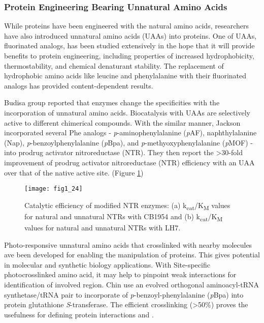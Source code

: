 \begin{refsection}
\subsubsection{Protein Engineering Bearing Unnatural Amino Acids}
\label{sec:uaa-intro}

While proteins have been engineered with the natural amino acids, researchers
have also introduced unnatural amino acids (UAAs) into
proteins\cite{Odar2015,Hassan2008,Kiick2000,Hammill2007,Meinnel1990,Johnson2010}.
One of UAAs, fluorinated analogs, has been studied extensively in the hope that
it will provide benefits to protein engineering, including properties of
increased hydrophobicity\cite{Biffinger2004},
thermostability\cite{Voloshchuk2010,Baker2011b}, and chemical denaturant
stability\cite{Voloshchuk2007b}. The replacement of hydrophobic amino acids
like leucine and phenylalanine with their fluorinated analogs has provided
content-dependent results\cite{Tang2001}.

Budisa group reported that enzymes change the specificities with the
incorporation of unnatural amino acids\cite{Budisa2006}. Biocatalysis with UAAs
are selectively active to different chimerical compounds. With the similar
manner, Jackson  incorporated several Phe analogs -
\emph{p}-aminophenylalanine (\emph{p}AF), naphthylalanine (Nap),
\emph{p}-benzoylphenylalanine (\emph{p}Bpa), and \emph{p}-methyoxyphenylalanine
(\emph{p}MOF) - into prodrug activator nitroreductase (NTR). They then report
the >30-fold improvement of prodrug activator nitroreductase (NTR) efficiency
with an UAA over that of the native active site\cite{Jackson2006a}. (Figure
\ref{fig:selectivity-example})
\begin{figure}[h!] \centering \texttt{[image: fig1\_24]}
    \caption[Catalytic efficiency of modified NTR enzymes: (a)
        k\textsubscript{cat}/K\textsubscript{M} values for natural and
        unnatural NTRs with CB1954 and (b)
        k\textsubscript{cat}/K\textsubscript{M} values for natural and
    unnatural NTRs with LH7.]{Catalytic efficiency of modified NTR enzymes: (a)
        k\textsubscript{cat}/K\textsubscript{M} values for natural and
        unnatural NTRs with CB1954 and (b)
        k\textsubscript{cat}/K\textsubscript{M} values for natural and
        unnatural NTRs with LH7\cite{Jackson2006a}.}
    \label{fig:selectivity-example} 
\end{figure}

Photo-responsive unnatural amino acids that crosslinked with nearby
molecules ave been developed for enabling the  manipulation of
proteins. This gives potential in molecular and synthetic biology applications.
With Site-specific photocrosslinked amino acid, it may help to pinpoint weak
interactions for identification of involved region. Chin  use an
evolved orthogonal aminoacyl-tRNA synthetase/tRNA pair to incorporate of
\emph{p}-benzoyl-phenylalanine (\emph{p}Bpa) into protein glutathione
\emph{S}-transferase\cite{Chin2002}. The efficient crosslinking (>50\%) proves
the usefulness for defining protein interactions  and .
\clearpage


\end{refsection}
